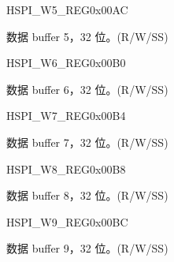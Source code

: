 \begin{register}{H}{SPI\_W5\_REG}{0x00AC}\label{regdesc:SPIW5REG}
%
\regnewline%
\begin{regdesc}\begin{reglist}
\label{fielddesc:SPIBUF5}\item [SPI\_BUF5] 数据 buffer 5，32 位。(R/W/SS)
\end{reglist}\end{regdesc}
\end{register}


\begin{register}{H}{SPI\_W6\_REG}{0x00B0}\label{regdesc:SPIW6REG}
%
\regnewline%
\begin{regdesc}\begin{reglist}
\label{fielddesc:SPIBUF6}\item [SPI\_BUF6] 数据 buffer 6，32 位。(R/W/SS)
\end{reglist}\end{regdesc}
\end{register}


\begin{register}{H}{SPI\_W7\_REG}{0x00B4}\label{regdesc:SPIW7REG}
%
\regnewline%
\begin{regdesc}\begin{reglist}
\label{fielddesc:SPIBUF7}\item [SPI\_BUF7] 数据 buffer 7，32 位。(R/W/SS)
\end{reglist}\end{regdesc}
\end{register}


\begin{register}{H}{SPI\_W8\_REG}{0x00B8}\label{regdesc:SPIW8REG}
%
\regnewline%
\begin{regdesc}\begin{reglist}
\label{fielddesc:SPIBUF8}\item [SPI\_BUF8] 数据 buffer 8，32 位。(R/W/SS)
\end{reglist}\end{regdesc}
\end{register}


\begin{register}{H}{SPI\_W9\_REG}{0x00BC}\label{regdesc:SPIW9REG}
%
\regnewline%
\begin{regdesc}\begin{reglist}
\label{fielddesc:SPIBUF9}\item [SPI\_BUF9] 数据 buffer 9，32 位。(R/W/SS)
\end{reglist}\end{regdesc}
\end{register}


